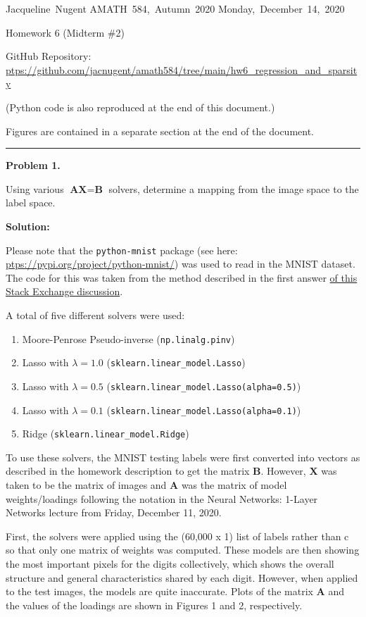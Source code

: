 \documentclass[10pt]{article}
\begin{document}
\hfill\vbox{\hbox{Jacqueline Nugent}
\hbox{AMATH 584, Autumn 2020}
\hbox{Monday, December 14, 2020}}

\vskip 10pt
\centerline{\Large{Homework 6 (Midterm \#2)}}
\vskip 5pt
\centerline{\small{GitHub Repository: \url{ptps://github.com/jacnugent/amath584/tree/main/hw6_regression_and_sparsity}}}
\centerline{\small{(Python code is also reproduced at the end of this document.)}}
\vskip 5pt
\centerline{\small{Figures are contained in a separate section at the end of the document.}}



\vskip 1cm
\hrule
{\bf Problem 1.}

Using various $\textbf{AX}=\textbf{B}$ solvers, determine a mapping from the image space to the label space.

\vskip 0.5cm
{\bf Solution:}

Please note that the \texttt{python-mnist} package (see here: \url{ptps://pypi.org/project/python-mnist/}) was used to read in the MNIST dataset. The code for this was taken from the method described in the first answer \href{ptps://stackoverflow.com/questions/40427435/extract-images-from-idx3-ubyte-file-or-gzip-via-python}{of this Stack Exchange discussion}. 

A total of five different solvers were used:
\begin{enumerate}
\item Moore-Penrose Pseudo-inverse (\texttt{np.linalg.pinv})
\item Lasso with $\lambda=1.0$ (\texttt{sklearn.linear\_model.Lasso})
\item Lasso with $\lambda=0.5$ (\texttt{sklearn.linear\_model.Lasso(alpha=0.5)})
\item Lasso with $\lambda=0.1$ (\texttt{sklearn.linear\_model.Lasso(alpha=0.1)})
\item Ridge (\texttt{sklearn.linear\_model.Ridge})
\end{enumerate}

To use these solvers, the MNIST testing labels were first converted into vectors as described in the homework description to get the matrix $\textbf{B}$. However, $\textbf{X}$ was taken to be the matrix of images and $\textbf{A}$ was the matrix of model weights/loadings following the notation in the Neural Networks: 1-Layer Networks lecture from Friday, December 11, 2020.

First, the solvers were applied using the (60,000 x 1) list of labels rather than c so that only one matrix of weights was computed. These models are then showing the most important pixels for the digits collectively, which shows the overall structure and general characteristics shared by each digit. However, when applied to the test images, the models are quite inaccurate. Plots of the matrix $\textbf{A}$ and the values of the loadings are shown in Figures 1 and 2, respectively. %
\end{document}
